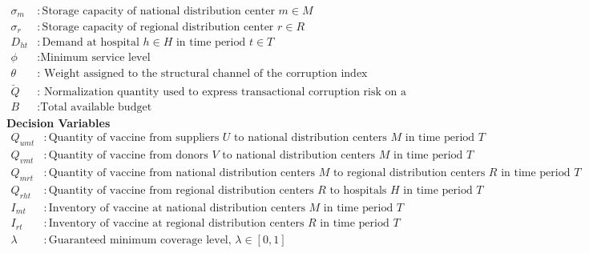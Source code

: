 \documentclass[a4paper]{elsarticle}
\begin{document}
{\begin{align*}
\sigma_{m} & : \text{Storage capacity of national distribution center } m \in M \\
\sigma_{r} & : \text{Storage capacity of regional distribution center } r \in R\\
D_{ht} & : \text{Demand at hospital } h \in H \text{ in time period } t \in T\\
\phi & : \text{Minimum service level} \\
\theta &: \text{ Weight assigned to the structural channel of the corruption index}\\
\breve{Q} &: \text{ Normalization quantity used to express transactional corruption risk on a per-dose basis}\\
B &: \text{Total available budget}
\end{align*}
\noindent \textbf{Decision Variables}\\
\begin{align*}
Q_{u m t} & : \text{Quantity of vaccine from suppliers } U \text{ to national distribution centers } M \text{ in time period } T\\
Q_{v m t} & : \text{Quantity of vaccine from donors } V \text{ to national distribution centers } M \text{ in time period } T\\
Q_{m r t} & : \text{Quantity of vaccine from national distribution centers } M \text{ to regional distribution centers } R \text{ in time period } T\\
Q_{r h t} & : \text{Quantity of vaccine from regional distribution centers } R \text{ to hospitals } H \text{ in time period } T\\
I_{m t} & : \text{Inventory of vaccine at national distribution centers } M \text{ in time period } T\\
I_{r t} & : \text{Inventory of vaccine at regional distribution centers } R \text{ in time period } T\\
\lambda & : \text{Guaranteed minimum coverage level, } \lambda \in [0,1]
\end{align*}

}
\end{document}
